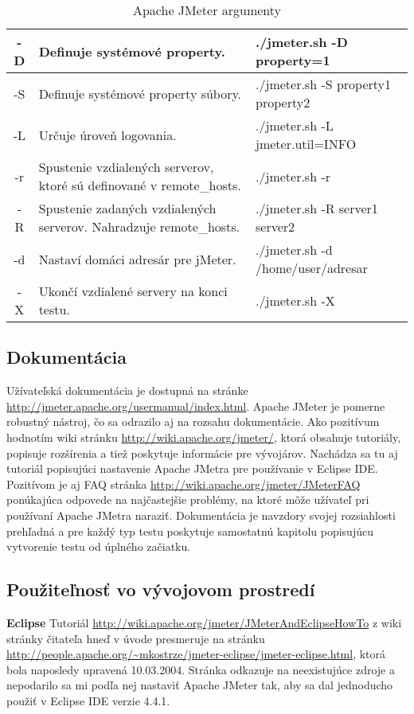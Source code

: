 \documentclass[12pt,oneside,final]{fithesis-utf8}
\begin{document}
\begin{table}[h!]
\begin{center}
\begin{tabular}{| c | p{8cm} | p{5cm} |}
	-D & Definuje systémové property. & ./jmeter.sh -D property=1 \\ \hline
	-S & Definuje systémové property súbory. & ./jmeter.sh -S property1 property2 \\ \hline
	-L & Určuje úroveň logovania. & ./jmeter.sh -L jmeter.util=INFO \\ \hline
	-r & Spustenie vzdialených serverov, ktoré sú definované v remote\_{}hosts. & ./jmeter.sh -r \\ \hline
	-R & Spustenie zadaných vzdialených serverov. Nahradzuje remote\_{}hosts. & ./jmeter.sh -R server1 server2 \\ \hline
	-d & Nastaví domáci adresár pre jMeter. & ./jmeter.sh -d /home/user/adresar \\ \hline
	-X & Ukončí vzdialené servery na konci testu. & ./jmeter.sh -X \\ \hline
	

\end{tabular}
\end{center}
\caption{Apache JMeter argumenty}
\end{table}

\newpage
\subsection{Dokumentácia}
Užívateľská dokumentácia je dostupná na stránke \url{http://jmeter.apache.org/usermanual/index.html}. Apache JMeter je pomerne robustný nástroj, čo sa odrazilo aj na rozsahu dokumentácie. Ako pozitívum hodnotím wiki stránku \url{http://wiki.apache.org/jmeter/}, ktorá obsahuje tutoriály, popisuje rozšírenia a tiež poskytuje informácie pre vývojárov. Nachádza sa tu aj tutoriál popisujúci nastavenie Apache JMetra pre používanie v Eclipse IDE. Pozitívom je aj FAQ stránka \url{http://wiki.apache.org/jmeter/JMeterFAQ} ponúkajúca odpovede na najčastejšie problémy, na ktoré môže užívateľ pri používaní Apache JMetra naraziť. Dokumentácia je navzdory svojej rozsiahlosti prehľadná a pre každý typ testu poskytuje samostatnú kapitolu popisujúcu vytvorenie testu od úplného začiatku.

\subsection{Použiteľnosť vo vývojovom prostredí}
\textbf{Eclipse}
\newline
Tutoriál \url{http://wiki.apache.org/jmeter/JMeterAndEclipseHowTo} z wiki stránky  čitateľa hneď v úvode presmeruje na stránku \url{http://people.apache.org/~mkostrze/jmeter-eclipse/jmeter-eclipse.html}, ktorá bola naposledy upravená 10.03.2004. Stránka odkazuje na neexistujúce zdroje a nepodarilo sa mi podľa nej nastaviť Apache JMeter tak, aby sa dal jednoducho použiť v Eclipse IDE verzie 4.4.1.
\newline
\end{document}
